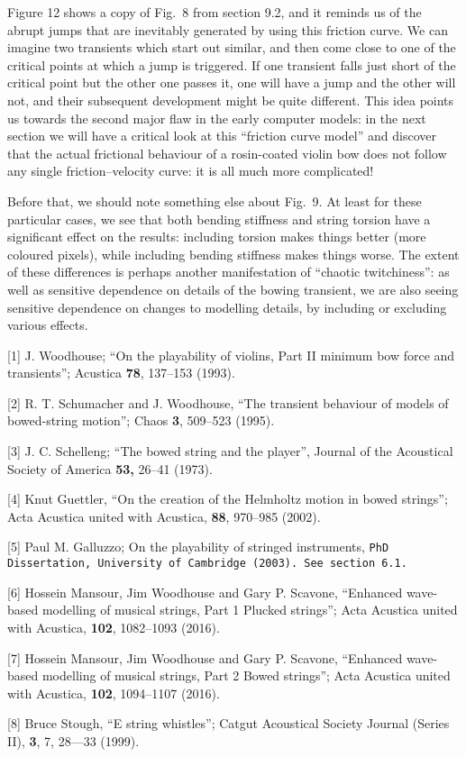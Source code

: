   Figure 12 shows a copy of Fig.\ 8 from section 9.2, and it reminds us of the 
  abrupt jumps that are inevitably generated by using this friction curve. We 
  can imagine two transients which start out similar, and then come close to 
  one of the critical points at which a jump is triggered. If one transient 
  falls just short of the critical point but the other one passes it, one will 
  have a jump and the other will not, and their subsequent development might be 
  quite different. This idea points us towards the second major flaw in the 
  early computer models: in the next section we will have a critical look at 
  this “friction curve model” and discover that the actual frictional behaviour 
  of a rosin-coated violin bow does not follow any single friction--velocity 
  curve: it is all much more complicated! 

  Before that, we should note something else about Fig.\ 9. At least for these 
  particular cases, we see that both bending stiffness and string torsion have 
  a significant effect on the results: including torsion makes things better 
  (more coloured pixels), while including bending stiffness makes things worse. 
  The extent of these differences is perhaps another manifestation of “chaotic 
  twitchiness”: as well as sensitive dependence on details of the bowing 
  transient, we are also seeing sensitive dependence on changes to modelling 
  details, by including or excluding various effects. 



  \sectionreferences{}[1] J. Woodhouse; ``On the playability of violins, Part 
  II minimum bow force and transients''; Acustica \textbf{78}, 137--153 (1993). 

  [2] R. T. Schumacher and J. Woodhouse, ``The transient behaviour of models of 
  bowed-string motion''; Chaos \textbf{3}, 509--523 (1995). 

  [3] J. C. Schelleng; ``The bowed string and the player'', Journal of the 
  Acoustical Society of America \textbf{53, }26–41 (1973). 

  [4] Knut Guettler, ``On the creation of the Helmholtz motion in bowed 
  strings''; Acta Acustica united with Acustica, \textbf{88}, 970--985 (2002). 

  [5] Paul M. Galluzzo; On the playability of stringed instruments, \tt{}PhD Dissertation\rm{}, University of Cambridge 
  (2003). See section 6.1. 

  [6] Hossein Mansour, Jim Woodhouse and Gary P. Scavone, ``Enhanced wave-based 
  modelling of musical strings, Part 1 Plucked strings''; Acta Acustica united 
  with Acustica, \textbf{102}, 1082--1093 (2016). 

  [7] Hossein Mansour, Jim Woodhouse and Gary P. Scavone, ``Enhanced wave-based 
  modelling of musical strings, Part 2 Bowed strings''; Acta Acustica united 
  with Acustica, \textbf{102}, 1094--1107 (2016). 

  [8] Bruce Stough, “E string whistles”; Catgut Acoustical Society Journal 
  (Series II), \textbf{3}, 7, 28—33 (1999). 